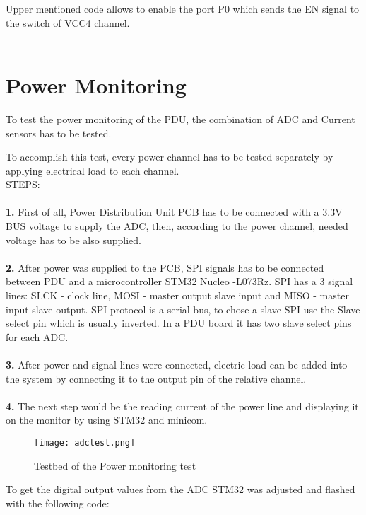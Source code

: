 	Upper mentioned code allows to enable the port P0 which sends the EN signal to the switch of VCC4 channel.\\ \\
	
	
	\section{Power Monitoring}
	
	To test the power monitoring of the PDU, the combination of ADC and Current sensors has to be tested. 
	
	To accomplish this test, every power channel has to be tested separately by applying electrical load to each channel. \\
	
	STEPS:\\ \\
	\textbf{1.} First of all, Power Distribution Unit PCB has to be connected with a 3.3V BUS voltage to supply the ADC, then, according to the power channel, needed voltage has to be also supplied. \\ \\
	\textbf{2.} After power  was supplied to the PCB, SPI signals has to be connected between PDU and a microcontroller STM32 Nucleo -L073Rz. SPI has a 3 signal lines: SLCK - clock line, MOSI - master output slave input and MISO - master input slave output. SPI protocol is a serial bus, to chose a slave SPI use the Slave select pin which is usually inverted. In a PDU board it has two slave select pins for each ADC.\\ \\
	\textbf{3.} After power and signal lines were connected, electric load can be added into the system by connecting it to the output pin of the relative channel.\\ \\
	\textbf{4.} The next step would be the reading current of the power line and displaying it on the monitor by using STM32 and minicom.
	  
	\begin{figure}[h]
		\centering
		\texttt{[image: adctest.png]}
		\caption{Testbed of the Power monitoring test}
		\label{fig: adctest}
	\end{figure}
	 
	 To get the digital output values from the ADC STM32 was adjusted and flashed with the following code:
	 
